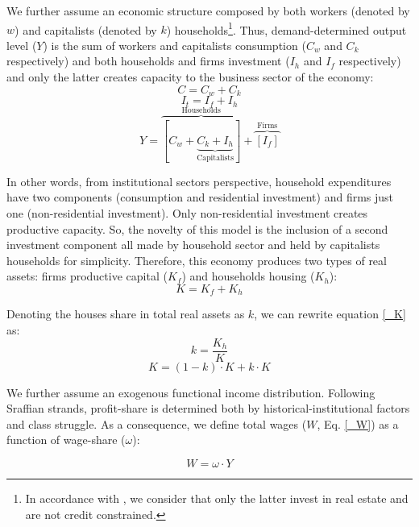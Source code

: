 \documentclass[11pt]{article}
\begin{document}
We further assume an economic structure composed by both workers (denoted by \(w\)) and capitalists (denoted by \(k\)) households\footnote{In accordance with \textcite{albanesi_credit_2017}, we consider that only the latter invest in real estate and are not credit constrained.}.
Thus, demand-determined output level (\(Y\))  is the sum of workers and capitalists consumption (\(C_w\) and \(C_k\) respectively) and both households and firms investment (\(I_h\) and \(I_f\) respectively) and only the latter creates capacity to the business sector of the economy:
\begin{equation}
\label{_Ct}
    C = C_w + C_k
\end{equation}
\begin{equation}
\label{_It}
    I_t = I_f + I_h
\end{equation}
\begin{equation}
\label{_Y}
    Y = \overbrace{[C_w + \underbrace{C_k + I_h}_{\text{Capitalists}}]}^{\text{Households}} + \overbrace{[I_f]}^{\text{Firms}}
\end{equation}

In other words, from institutional sectors perspective, household expenditures have two components (consumption and residential investment) and firms just one (non-residential investment). 
Only non-residential investment creates productive capacity. 
So, the novelty of this model is the inclusion of a second investment component all made by household sector and held by capitalists households for simplicity. 
Therefore, this economy produces two types of real assets: firms productive capital (\(K_f\)) and households housing (\(K_h\)):
\begin{equation}
    \label{_K}
    K = K_f + K_h
\end{equation}

Denoting the houses share in total real assets as \(k\), we can rewrite equation \ref{_K} as:
\begin{equation}
\label{_k}
    k = \frac{K_h}{K}
\end{equation}
$$
K = (1-k)\cdot K + k\cdot K
$$

We further assume an exogenous functional income distribution. 
Following Sraffian strands, profit-share is determined both by historical-institutional factors and class struggle.
As a consequence, we define total wages (\(W\), Eq. \ref{_W}) as a function of wage-share (\(\omega\)):

\begin{equation}
\label{_W}
    W = \omega\cdot Y
\end{equation}
\end{document}
